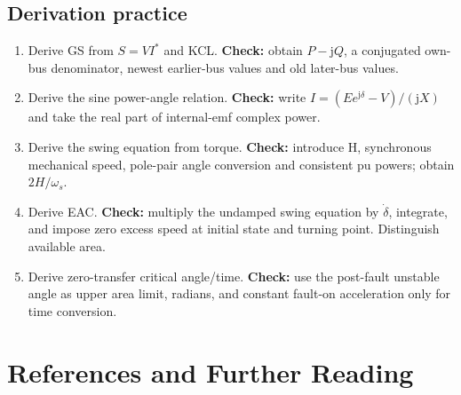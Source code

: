 \documentclass[11pt,a4paper]{article}
\newcommand{\chapterstart}[2]{\par\needspace{12\baselineskip}\section{#1}\label{#2}}
\newcommand{\jj}{\mathrm j}
\begin{document}
\subsection{Derivation practice}
\begin{enumerate}
\item Derive GS from $S=VI^*$ and KCL. \textbf{Check:} obtain $P-\jj Q$, a conjugated own-bus denominator, newest earlier-bus values and old later-bus values.
\item Derive the sine power-angle relation. \textbf{Check:} write $I=(Ee^{\jj\delta}-V)/(\jj X)$ and take the real part of internal-emf complex power.
\item Derive the swing equation from torque. \textbf{Check:} introduce H, synchronous mechanical speed, pole-pair angle conversion and consistent pu powers; obtain $2H/\omega_s$.
\item Derive EAC. \textbf{Check:} multiply the undamped swing equation by $\dot\delta$, integrate, and impose zero excess speed at initial state and turning point. Distinguish available area.
\item Derive zero-transfer critical angle/time. \textbf{Check:} use the post-fault unstable angle as upper area limit, radians, and constant fault-on acceleration only for time conversion.
\end{enumerate}

\chapterstart{References and Further Reading}{sources}
\end{document}
